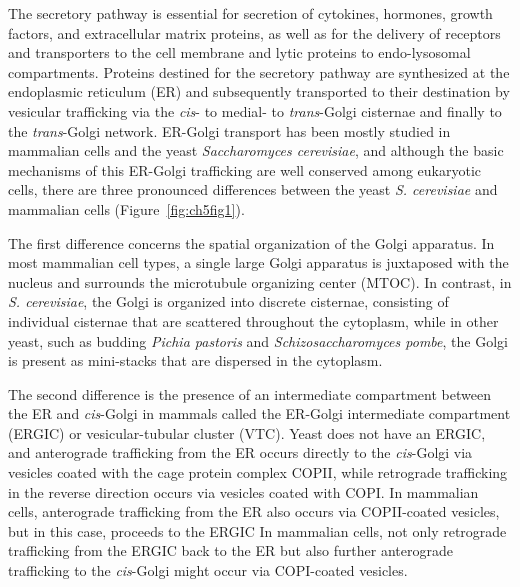 The secretory pathway is essential for secretion of cytokines, hormones, growth factors, and extracellular matrix proteins, as well as for the delivery of receptors and transporters to the cell membrane and lytic proteins to endo-lysosomal compartments. Proteins destined for the secretory pathway are synthesized at the endoplasmic reticulum (ER) and subsequently transported to their destination by vesicular trafficking via the \emph{cis}- to medial- to \emph{trans}-Golgi cisternae and finally to the \emph{trans}-Golgi network\cite{puthenveedu_subcompartmentalizing_2005,cottam_retrograde_2012,malsam_organization_2011}. ER-Golgi transport has been mostly studied in mammalian cells and the yeast \emph{Saccharomyces cerevisiae}, and although the basic mechanisms of this ER-Golgi trafficking are well conserved among eukaryotic cells, there are three pronounced differences between the yeast \emph{S. cerevisiae} and mammalian cells (Figure~\ref{fig:ch5fig1}). 

The first difference concerns the spatial organization of the Golgi apparatus. In most mammalian cell types, a single large Golgi apparatus is juxtaposed with the nucleus and surrounds the microtubule organizing center (MTOC)\cite{cottam_retrograde_2012,papanikou_yeast_2009,jackson_mechanisms_2009}. In contrast, in \emph{S. cerevisiae}, the Golgi is organized into discrete cisternae, consisting of individual cisternae that are scattered throughout the cytoplasm, while in other yeast, such as budding \emph{Pichia pastoris} and \emph{Schizosaccharomyces pombe}, the Golgi is present as mini-stacks that are dispersed in the cytoplasm\cite{papanikou_yeast_2009,jackson_mechanisms_2009}. 

The second difference is the presence of an intermediate compartment between the ER and \emph{cis}-Golgi in mammals called the ER-Golgi intermediate compartment (ERGIC) or vesicular-tubular cluster (VTC)\cite{rowe_role_1998}. Yeast does not have an ERGIC, and anterograde trafficking from the ER occurs directly to the \emph{cis}-Golgi\cite{barlowe_copii_1994} via vesicles coated with the cage protein complex COPII, while retrograde trafficking in the reverse direction occurs via vesicles coated with COPI\cite{cottam_retrograde_2012,papanikou_yeast_2009}. In mammalian cells, anterograde trafficking from the ER also occurs via COPII-coated vesicles, but in this case, proceeds to the ERGIC\cite{cottam_retrograde_2012,papanikou_yeast_2009,jackson_mechanisms_2009} In mammalian cells, not only retrograde trafficking from the ERGIC back to the ER but also further anterograde trafficking to the \emph{cis}-Golgi might occur via COPI-coated vesicles\cite{appenzeller-herzog_er-golgi_2006}. 

